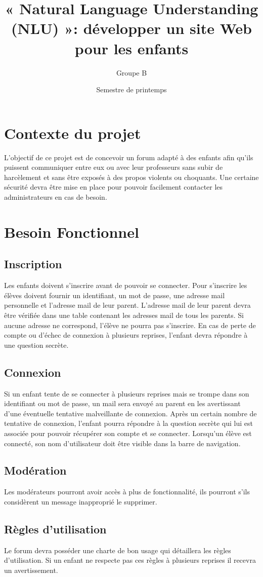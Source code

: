\documentclass[12pt]{article}
\title{\bf« Natural Language Understanding (NLU) »: développer un site Web pour les enfants}
\author{Groupe B}
\date{Semestre de printemps}
\begin{document}
\maketitle
\section{Contexte du projet}
L'objectif de ce projet est de concevoir un forum adapté à des enfants afin qu'ils puissent communiquer entre eux ou avec leur professeurs sans subir de harcèlement et sans être exposés à des propos violents ou choquants. Une certaine sécurité devra être mise en place pour pouvoir facilement contacter les administrateurs en cas de besoin.
\section{Besoin Fonctionnel}
\subsection{Inscription}
Les enfants doivent s'inscrire avant de pouvoir se connecter. Pour s'inscrire les élèves doivent fournir un identifiant, un mot de passe, une adresse mail personnelle et l'adresse mail de leur parent.
L'adresse mail de leur parent devra être vérifiée dans une table contenant les adresses mail de tous les parents. Si aucune adresse ne correspond, l'élève ne pourra pas s'inscrire. 
En cas de perte de compte ou d'échec de connexion à plusieurs reprises, l'enfant devra répondre à une question secrète.
\subsection{Connexion}
Si un enfant tente de se connecter à plusieurs reprises mais se trompe dans son identifiant ou mot de passe, un mail sera envoyé au parent en les avertissant d'une éventuelle tentative malveillante de connexion. Après un certain nombre de tentative de connexion, l'enfant pourra répondre à la question secrète qui lui est associée pour pouvoir récupérer son compte et se connecter.
Lorsqu'un élève est connecté, son nom d'utilisateur doit être visible dans la barre de navigation.
\subsection{Modération}
Les modérateurs pourront avoir accès à plus de fonctionnalité, ils pourront s'ils considèrent un message inapproprié le supprimer.
\subsection{Règles d'utilisation}
Le forum devra posséder une charte de bon usage qui détaillera les règles d'utilisation. Si un enfant ne respecte pas ces règles à plusieurs reprises il recevra un avertissement.
\end{document}
